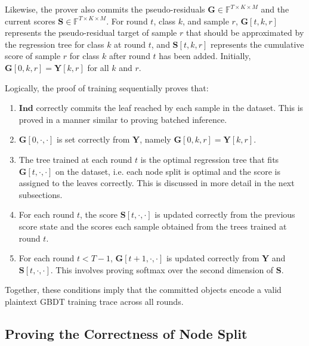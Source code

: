 Likewise, the prover also commits the pseudo-residuals
$\mathbf{G}\in \mathbb{F}^{T\times K\times M}$ and the current scores
$\mathbf{S}\in \mathbb{F}^{T\times K\times M}$.
For round $t$, class $k$, and sample $r$,
$\mathbf{G}[t,k,r]$ represents the pseudo-residual target of sample $r$ that
should be approximated by the regression tree for class $k$ at round $t$, and
$\mathbf{S}[t,k,r]$ represents the cumulative score of sample $r$ for class
$k$ after round $t$ has been added.
Initially, $\mathbf{G}[0,k,r]=\mathbf{Y}[k,r]$ for all $k$ and $r$.

Logically, the proof of training sequentially proves that:
\begin{enumerate}
  \item $\mathbf{Ind}$ correctly commits the leaf reached by each sample in the dataset.
    This is proved in a manner similar to proving batched inference.
  \item $\mathbf{G}[0, \cdot, \cdot]$ is set correctly from $\mathbf{Y}$,
    namely $\mathbf{G}[0,k,r]=\mathbf{Y}[k,r]$.
  \item The tree trained at each round $t$ is the optimal regression tree that fits $\mathbf{G}[t, \cdot, \cdot]$ on the dataset,
    i.e. each node split is optimal and the score is assigned to the leaves correctly. This is discussed in more detail in the next subsections.
  \item For each round $t$, the score $\mathbf{S}[t, \cdot, \cdot]$ is updated correctly
    from the previous score state and the scores each sample obtained from the trees trained at round $t$.
  \item For each round $t<T-1$, $\mathbf{G}[t+1, \cdot, \cdot]$ is updated correctly from $\mathbf{Y}$ and $\mathbf{S}[t, \cdot, \cdot]$.
    This involves proving softmax over the second dimension of $\mathbf{S}$.
\end{enumerate}

Together, these conditions imply that the committed objects encode a valid
plaintext GBDT training trace across all rounds.

\subsection{Proving the Correctness of Node Split}

